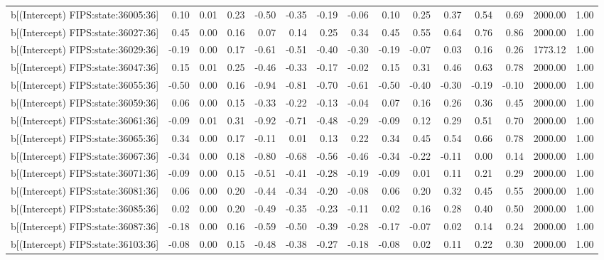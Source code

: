 \begin{table}[ht]
\begin{tabular}{rrrrrrrrrrrrrrr}
  b[(Intercept) FIPS:state:36005:36] & 0.10 & 0.01 & 0.23 & -0.50 & -0.35 & -0.19 & -0.06 & 0.10 & 0.25 & 0.37 & 0.54 & 0.69 & 2000.00 & 1.00 \\ 
  b[(Intercept) FIPS:state:36027:36] & 0.45 & 0.00 & 0.16 & 0.07 & 0.14 & 0.25 & 0.34 & 0.45 & 0.55 & 0.64 & 0.76 & 0.86 & 2000.00 & 1.00 \\ 
  b[(Intercept) FIPS:state:36029:36] & -0.19 & 0.00 & 0.17 & -0.61 & -0.51 & -0.40 & -0.30 & -0.19 & -0.07 & 0.03 & 0.16 & 0.26 & 1773.12 & 1.00 \\ 
  b[(Intercept) FIPS:state:36047:36] & 0.15 & 0.01 & 0.25 & -0.46 & -0.33 & -0.17 & -0.02 & 0.15 & 0.31 & 0.46 & 0.63 & 0.78 & 2000.00 & 1.00 \\ 
  b[(Intercept) FIPS:state:36055:36] & -0.50 & 0.00 & 0.16 & -0.94 & -0.81 & -0.70 & -0.61 & -0.50 & -0.40 & -0.30 & -0.19 & -0.10 & 2000.00 & 1.00 \\ 
  b[(Intercept) FIPS:state:36059:36] & 0.06 & 0.00 & 0.15 & -0.33 & -0.22 & -0.13 & -0.04 & 0.07 & 0.16 & 0.26 & 0.36 & 0.45 & 2000.00 & 1.00 \\ 
  b[(Intercept) FIPS:state:36061:36] & -0.09 & 0.01 & 0.31 & -0.92 & -0.71 & -0.48 & -0.29 & -0.09 & 0.12 & 0.29 & 0.51 & 0.70 & 2000.00 & 1.00 \\ 
  b[(Intercept) FIPS:state:36065:36] & 0.34 & 0.00 & 0.17 & -0.11 & 0.01 & 0.13 & 0.22 & 0.34 & 0.45 & 0.54 & 0.66 & 0.78 & 2000.00 & 1.00 \\ 
  b[(Intercept) FIPS:state:36067:36] & -0.34 & 0.00 & 0.18 & -0.80 & -0.68 & -0.56 & -0.46 & -0.34 & -0.22 & -0.11 & 0.00 & 0.14 & 2000.00 & 1.00 \\ 
  b[(Intercept) FIPS:state:36071:36] & -0.09 & 0.00 & 0.15 & -0.51 & -0.41 & -0.28 & -0.19 & -0.09 & 0.01 & 0.11 & 0.21 & 0.29 & 2000.00 & 1.00 \\ 
  b[(Intercept) FIPS:state:36081:36] & 0.06 & 0.00 & 0.20 & -0.44 & -0.34 & -0.20 & -0.08 & 0.06 & 0.20 & 0.32 & 0.45 & 0.55 & 2000.00 & 1.00 \\ 
  b[(Intercept) FIPS:state:36085:36] & 0.02 & 0.00 & 0.20 & -0.49 & -0.35 & -0.23 & -0.11 & 0.02 & 0.16 & 0.28 & 0.40 & 0.50 & 2000.00 & 1.00 \\ 
  b[(Intercept) FIPS:state:36087:36] & -0.18 & 0.00 & 0.16 & -0.59 & -0.50 & -0.39 & -0.28 & -0.17 & -0.07 & 0.02 & 0.14 & 0.24 & 2000.00 & 1.00 \\ 
  b[(Intercept) FIPS:state:36103:36] & -0.08 & 0.00 & 0.15 & -0.48 & -0.38 & -0.27 & -0.18 & -0.08 & 0.02 & 0.11 & 0.22 & 0.30 & 2000.00 & 1.00 \\ 

\end{tabular}
\end{table}
